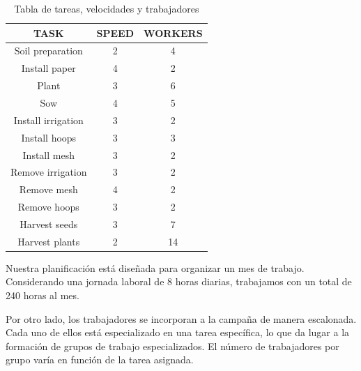  \begin{table}[ht!]
    \centering
    \begin{minipage}{0.48\textwidth}
        \centering
        \begin{tabular}{|c|c|c|}
            \hline
            \rowcolor{gray!30} \textbf{\textcolor{grey3}{TASK}} & \textbf{\textcolor{grey3}{SPEED}} &  \textbf{\textcolor{grey3}{WORKERS}}\\ 
            \hline
            Soil preparation   & 2 & 4 \\ \hline
            Install paper      & 4 & 2\\ \hline
            Plant              & 3 & 6\\ \hline
            Sow                & 4 & 5\\ \hline
            Install irrigation & 3 & 2 \\ \hline
            Install hoops      & 3 & 3 \\ \hline
            Install mesh       & 3 & 2 \\ \hline
            Remove irrigation  & 3 & 2 \\ \hline
            Remove mesh        & 4 & 2 \\ \hline
            Remove hoops       & 3 & 2 \\ \hline
            Harvest seeds      & 3 & 7 \\ \hline
            Harvest plants     & 2 & 14 \\ 
            \hline
        \end{tabular}
        \caption{Tabla de tareas, velocidades y trabajadores}
        \label{tab:tareas}
    \end{minipage}
    \hfill
\end{table}
Nuestra planificación está diseñada para organizar un mes de trabajo. Considerando una jornada laboral de 8 horas diarias, 
trabajamos con un total de 240 horas al mes.

Por otro lado, los trabajadores se incorporan a la campaña de manera escalonada. Cada uno de ellos está especializado en una 
tarea específica, lo que da lugar a la formación de grupos de trabajo especializados. El número de trabajadores por grupo varía 
en función de la tarea asignada.

